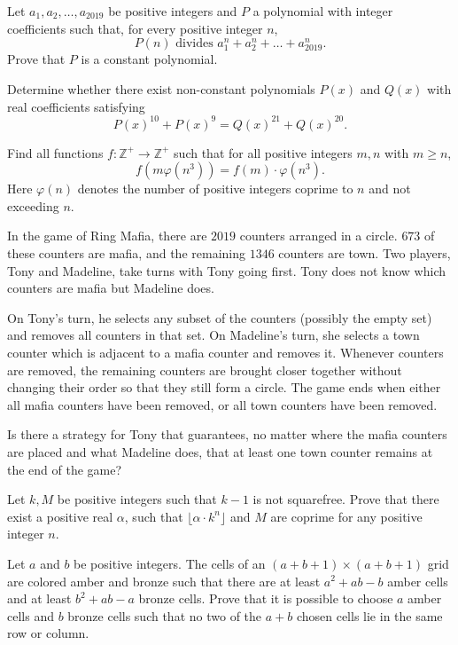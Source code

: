 \documentclass[11pt]{scrartcl}
\begin{document}
\begin{problem}[247248446755838]
	Let $a_1, a_2, \dots, a_{2019}$ be positive integers and $P$ a polynomial with integer coefficients such that, for every positive integer $n$,
$$P(n) \text{ divides  } a_1^n+a_2^n+\dots+a_{2019}^n.$$Prove that $P$ is a constant polynomial.
\end{problem}
\begin{problem}[254414643421075]
Determine whether there exist non-constant polynomials $P(x)$ and $Q(x)$ with real coefficients satisfying
$$P(x)^{10}+P(x)^9 = Q(x)^{21}+Q(x)^{20}.$$
\end{problem}
\begin{problem}[254876905002494]
	Find all functions $f: \mathbb{Z}^+\rightarrow \mathbb{Z}^+$ such that for all positive integers $m,n$ with $m\ge n$,$$f(m\varphi(n^3)) = f(m)\cdot \varphi(n^3).$$Here $\varphi(n)$ denotes the number of positive integers coprime to $n$ and not exceeding $n$.
\end{problem}
\begin{problem}[255228327462897]
In the game of Ring Mafia, there are $2019$ counters arranged in a circle. $673$ of these counters are mafia, and the remaining $1346$ counters are town. Two players, Tony and Madeline, take turns with Tony going first. Tony does not know which counters are mafia but Madeline does.

On Tony’s turn, he selects any subset of the counters (possibly the empty set) and removes all counters in that set. On Madeline’s turn, she selects a town counter which is adjacent to a mafia counter and removes it. Whenever counters are removed, the remaining counters are brought closer together without changing their order so that they still form a circle. The game ends when either all mafia counters have been removed, or all town counters have been removed.

Is there a strategy for Tony that guarantees, no matter where the mafia counters are placed and what Madeline does, that at least one town counter remains at the end of the game?
\end{problem}
\begin{problem}[256994274302985]
	Let $k, M$ be positive integers such that $k-1$ is not squarefree. Prove that there exist a positive real $\alpha$, such that $\lfloor \alpha\cdot k^n \rfloor$ and $M$ are coprime for any positive integer $n$.
\end{problem}
\begin{problem}[257453182523555]
Let $a$ and $b$ be positive integers. The cells of an $(a+b+1)\times (a+b+1)$ grid are colored amber and bronze such that there are at least $a^2+ab-b$ amber cells and at least $b^2+ab-a$ bronze cells. Prove that it is possible to choose $a$ amber cells and $b$ bronze cells such that no two of the $a+b$ chosen cells lie in the same row or column.
\end{problem}
\end{document}
